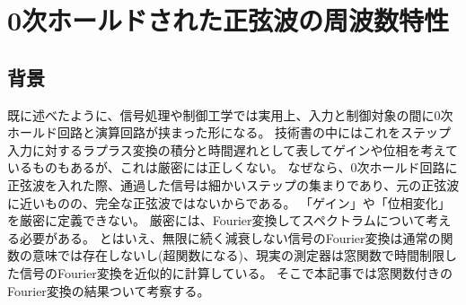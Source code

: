 \chapter{0次ホールドされた正弦波の周波数特性}
    \label{0次ホールドされた正弦波の周波数特性}
    \section{背景}
        既に述べたように、信号処理や制御工学では実用上、入力と制御対象の間に0次ホールド回路と演算回路が挟まった形になる。
        技術書の中にはこれをステップ入力に対するラプラス変換の積分と時間遅れとして表してゲインや位相を考えているものもあるが、これは厳密には正しくない。
        なぜなら、0次ホールド回路に正弦波を入れた際、通過した信号は細かいステップの集まりであり、元の正弦波に近いものの、完全な正弦波ではないからである。
        「ゲイン」や「位相変化」を厳密に定義できない。
        厳密には、Fourier変換してスペクトラムについて考える必要がある。
        とはいえ、無限に続く減衰しない信号のFourier変換は通常の関数の意味では存在しないし(超関数になる)、現実の測定器は窓関数で時間制限した信号のFourier変換を近似的に計算している。
        そこで本記事では窓関数付きのFourier変換の結果ついて考察する。
